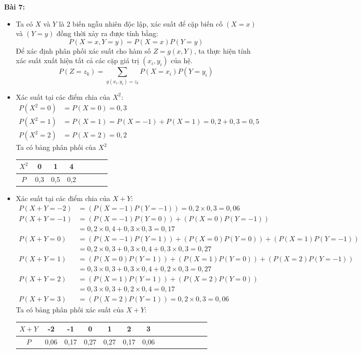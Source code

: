 \documentclass[12pt]{article}
\begin{document}
\textbf{Bài 7:}

\begin{itemize}

    \item Ta có $X$ và $Y$ là 2 biến ngẫu nhiên độc lập, xác suất để cặp biến cố $(X=x)$ và $(Y=y)$ đồng thời xảy ra được tính bằng:
    \[
    P(X=x, Y=y) = P(X = x)P(Y = y)
    \]
    Để xác định phân phối xác suất cho hàm số $Z=g(x, Y)$, ta thực hiện tính xác suất xuất hiện tất cả các cặp giá trị $(x_i, y_i)$ của hệ.
    \[
    P(Z=z_k) = \sum_{g(x_i,y_i)=z_k} P(X=x_i)P(Y=y_i)
    \]
    \item Xác suất tại các điểm chia của $X^2$:
    \[
    \begin{aligned}
    P(X^2 = 0) &= P(X = 0) = 0,3\\
    P(X^2 = 1) &= P(X = 1) = P(X = -1) + P(X = 1) = 0,2 + 0,3 = 0,5 \\
    P(X^2 = 2) &= P(X = 2) = 0,2
    \end{aligned}
    \]
    Ta có bảng phân phối của $X^2$
    \begin{center}
        \begin{tabular}{|Sc|Sc|Sc|Sc|}
            \hline
            $X^2$ & 0 & 1 & 4 \\
            \hline
            $P$ & 0,3 & 0,5 & 0,2\\
            \hline        
        \end{tabular}
    \end{center}
    \item Xác suất tại các điểm chia của $X+Y$:
    \[
    \begin{aligned}
    P(X + Y = -2) &= (P(X = -1)P(Y = -1)) = 0,2 \times 0,3 = 0,06 \\
    P(X + Y = -1) &= (P(X = -1)P(Y = 0)) + (P(X = 0)P(Y = -1)) \\
    &= 0,2 \times 0,4 + 0,3 \times 0,3 = 0,17 \\ 
    P(X + Y = 0) &= (P(X = -1)P(Y = 1)) + (P(X = 0)P(Y = 0)) + (P(X=1)P(Y = -1)) \\
    &= 0,2 \times 0,3 + 0,3 \times 0,4 + 0,3 \times 0,3 = 0,27\\
    P(X + Y = 1) &= (P(X = 0)P(Y = 1)) + (P(X = 1)P(Y = 0)) + (P(X = 2)P(Y = -1)) \\
    &= 0,3 \times 0,3 + 0,3 \times 0,4 + 0,2 \times 0,3 = 0,27 \\
    P(X + Y = 2) &= (P(X = 1)P(Y = 1)) + (P(X = 2)P(Y = 0)) \\
    &= 0,3 \times 0,3 + 0,2 \times 0,4 = 0,17 \\
    P(X + Y = 3) &= (P(X = 2)P(Y = 1)) = 0,2 \times 0,3 = 0,06
    \end{aligned}
    \]
    Ta có bảng phân phối xác suất của $X + Y$:
    \begin{center}
        \begin{tabular}{|Sc|Sc|Sc|Sc|Sc|Sc|Sc|}
        \hline
        $X+Y$ & -2 & -1 & 0 & 1 & 2 & 3\\
        \hline
        $P$ & 0,06 & 0,17 & 0,27 & 0,27 & 0,17 & 0,06 \\
        \hline 
        \end{tabular}
    \end{center}


\end{itemize}
\end{document}
